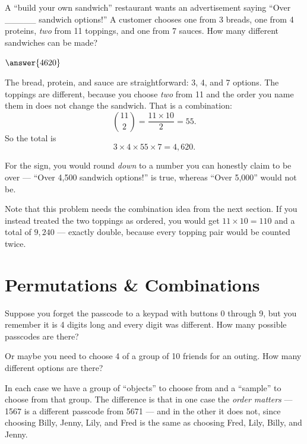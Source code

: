 \documentclass[12pt]{ximera}
\begin{document}
\begin{problem}
A ``build your own sandwich'' restaurant wants an advertisement saying ``Over \_\_\_\_\_
sandwich options!'' A customer chooses one from 3 breads, one from 4 proteins,
\emph{two} from 11 toppings, and one from 7 sauces. How many different sandwiches can be
made?

$\answer{4620}$

\begin{freeResponse}
\end{freeResponse}

\begin{solution}
The bread, protein, and sauce are straightforward: 3, 4, and 7 options. The toppings are
different, because you choose \emph{two} from 11 and the order you name them in does not
change the sandwich. That is a combination:
\[
\binom{11}{2} = \frac{11 \times 10}{2} = 55.
\]
So the total is
\[
3 \times 4 \times 55 \times 7 = 4{,}620.
\]

For the sign, you would round \emph{down} to a number you can honestly claim to be over
--- ``Over 4,500 sandwich options!'' is true, whereas ``Over 5,000'' would not be.

Note that this problem needs the combination idea from the next section. If you instead
treated the two toppings as ordered, you would get $11 \times 10 = 110$ and a total of
$9{,}240$ --- exactly double, because every topping pair would be counted twice.
\end{solution}
\end{problem}

\section*{Permutations \& Combinations}

Suppose you forget the passcode to a keypad with buttons 0 through 9, but you remember it
is 4 digits long and every digit was different. How many possible passcodes are there?

Or maybe you need to choose 4 of a group of 10 friends for an outing. How many different
options are there?

In each case we have a group of ``objects'' to choose from and a ``sample'' to choose from
that group. The difference is that in one case the \emph{order matters} --- 1567 is a
different passcode from 5671 --- and in the other it does not, since choosing Billy,
Jenny, Lily, and Fred is the same as choosing Fred, Lily, Billy, and Jenny.
\end{document}
